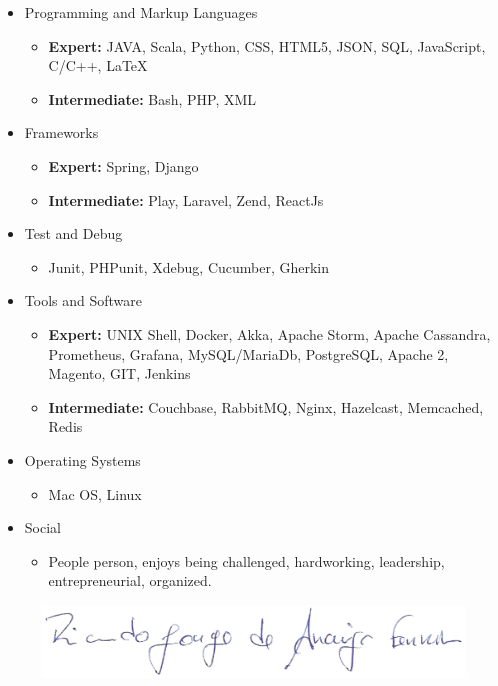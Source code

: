 \documentclass[letterpaper,11pt]{article}
\newcommand{\resitem}[1]{\item #1 \vspace{2pt}}
\begin{document}
\begin{itemize}
\item
	Programming and Markup Languages
	\begin{itemize}
		\resitem{{\bf Expert:}  JAVA, Scala, Python, CSS, HTML5, JSON, SQL, JavaScript, C/C++, \LaTeX}
		\resitem{{\bf Intermediate:} Bash, PHP, XML}
    \end{itemize}
\end{itemize} 
\hspace{20pt}
\begin{itemize}
\item
	Frameworks
	\begin{itemize}
		\resitem{{\bf Expert:} Spring, Django}
		\resitem{{\bf Intermediate:} Play, Laravel, Zend, ReactJs}
	\end{itemize}
	
	\item
	Test and Debug
	\begin{itemize}
		\resitem{Junit, PHPunit, Xdebug, Cucumber, Gherkin}
	\end{itemize}

\item
	Tools and Software
	\begin{itemize}
		\resitem{{\bf Expert:} UNIX Shell, Docker, Akka, Apache Storm, Apache Cassandra, Prometheus, Grafana, MySQL/MariaDb, PostgreSQL, Apache 2, Magento, GIT, Jenkins}
		\resitem{{\bf Intermediate:} Couchbase, RabbitMQ, Nginx, Hazelcast, Memcached, Redis}
	\end{itemize}
	
	\item
	Operating Systems
	\begin{itemize}
		\resitem{Mac OS, Linux}
	\end{itemize}

	\item
	Social
	\begin{itemize}
		\resitem{People person, enjoys being challenged, hardworking, leadership, entrepreneurial, organized.}
	\end{itemize}
\end{itemize}



\vspace{5mm}

\begin{figure}[h]
\centering
{\includegraphics[scale=0.25]{img/sig.png}}
\end{figure}
\end{document}
